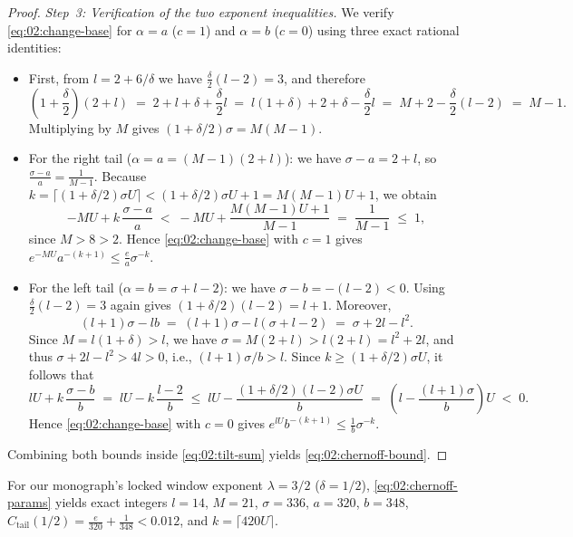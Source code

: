 \begin{proof}
\emph{Step~3: Verification of the two exponent inequalities.}
We verify \eqref{eq:02:change-base} for $\alpha = a$ ($c = 1$) and $\alpha = b$ ($c = 0$) using three exact rational identities:
\begin{itemize}
\item First, from $l = 2 + 6/\delta$ we have $\frac{\delta}{2}(l - 2) = 3$, and therefore
  \[
    \left(1 + \frac{\delta}{2}\right)(2 + l) \;=\; 2 + l + \delta + \frac{\delta}{2}l
    \;=\; l(1 + \delta) + 2 + \delta - \frac{\delta}{2}l
    \;=\; M + 2 - \frac{\delta}{2}(l - 2) \;=\; M - 1.
  \]
  Multiplying by $M$ gives $(1 + \delta/2)\sigma = M(M - 1)$.
\item For the right tail ($\alpha = a = (M-1)(2+l)$): we have $\sigma - a = 2 + l$, so $\frac{\sigma - a}{a} = \frac{1}{M - 1}$. Because $k = \lceil (1+\delta/2)\sigma U \rceil < (1+\delta/2)\sigma U + 1 = M(M-1)U + 1$, we obtain
  \[
    -MU + k\,\frac{\sigma - a}{a}
    \;<\; -MU + \frac{M(M-1)U + 1}{M - 1}
    \;=\; \frac{1}{M - 1} \;\le\; 1,
  \]
  since $M > 8 > 2$. Hence \eqref{eq:02:change-base} with $c = 1$ gives $e^{-MU} a^{-(k+1)} \le \frac{e}{a}\sigma^{-k}$.
\item For the left tail ($\alpha = b = \sigma + l - 2$): we have $\sigma - b = -(l - 2) < 0$. Using $\frac{\delta}{2}(l-2) = 3$ again gives $(1 + \delta/2)(l - 2) = l + 1$. Moreover,
  \[
    (l + 1)\sigma - l b \;=\; (l + 1)\sigma - l(\sigma + l - 2) \;=\; \sigma + 2l - l^2.
  \]
  Since $M = l(1+\delta) > l$, we have $\sigma = M(2+l) > l(2+l) = l^2 + 2l$, and thus $\sigma + 2l - l^2 > 4l > 0$, i.e., $(l+1)\sigma / b > l$. Since $k \ge (1+\delta/2)\sigma U$, it follows that
  \[
    l U + k\,\frac{\sigma - b}{b}
    \;=\; l U - k\,\frac{l - 2}{b}
    \;\le\; l U - \frac{(1 + \delta/2)(l - 2)\sigma U}{b}
    \;=\; \left(l - \frac{(l + 1)\sigma}{b}\right) U \;<\; 0.
  \]
  Hence \eqref{eq:02:change-base} with $c = 0$ gives $e^{lU} b^{-(k+1)} \le \frac{1}{b}\sigma^{-k}$.
\end{itemize}
Combining both bounds inside \eqref{eq:02:tilt-sum} yields \eqref{eq:02:chernoff-bound}.
\end{proof}

\begin{example}[Parameters for the active window $\lambda = 3/2$]
For our monograph's locked window exponent $\lambda = 3/2$ ($\delta = 1/2$), \eqref{eq:02:chernoff-params} yields exact integers $l = 14$, $M = 21$, $\sigma = 336$, $a = 320$, $b = 348$, $C_{\mathrm{tail}}(1/2) = \frac{e}{320} + \frac{1}{348} < 0.012$, and $k = \lceil 420 U \rceil$.
\end{example}

